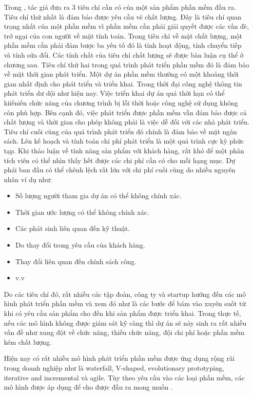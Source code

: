 \documentclass{article}
\begin{document}
Trong \cite{wisdomjobs}, tác giả đưa ra 3 tiêu chí cần có của một sản phẩm phần mềm đầu ra. Tiêu chí thứ nhất là đảm bảo được yêu cầu vè chất lượng. Đây là tiêu chí quan trọng nhất của một phần mềm vì phần mềm cần phải giải quyết được các vấn đè, trở ngại của con người về mặt tính toán. Trong tiêu chí về mặt chất lượng, một phần mềm cần phải đảm bược ba yếu tố đó là tính hoạt động, tính chuyển tiếp và tính sửa đổi. Các tính chất của tiêu chí chất lượng sẽ được bàn luận cụ thể ở chương sau. Tiêu chí thứ hai trong quá trình phát triển phần mềm đó là đảm bảo về mặt thời gian phát triển. Một dự án phần mềm thường có một khoảng thời gian nhất định cho phát triển và triển khai. Trong thời đại công nghệ thông tin phát triển dư dội như hiện nay. Việc triển khai dự án quá thời hạn có thể kiiếniến chức năng của chương trình bị lỗi thời hoặc công nghệ sử dụng không còn phù hợp. Bên cạnh đó, việc phát triển được phần mềm vẫn đảm bảo được cả chất lượng và thời gian cho phép không phải là việc dễ đối với các nhà phát triển. Tiêu chí cuối cùng của quá trình phát triển đó chính là đảm bảo về mặt ngân sách. Lên kế hoạch và tính toán chi phí phát triển là một quá trình cực kỳ phức tạp. Khi thảo luận về tính năng sản phẩm với khách hàng, rất khó để một phân tích viên có thể nhìn thấy hết được các chi phí cần có cho mỗi hạng mục. Dự phái ban đầu có thể chênh lệch rất lớn với chi phí cuối cùng do nhiều nguyên nhân ví dụ như:
\begin{itemize}
	\item Số lượng người tham gia dự án có thể không chính xác.
	\item Thời gian ước lượng có thể không chính xác.
	\item Các phát sinh liên quan đến kỹ thuật.
	\item Do thay đổi trong yêu cầu của khách hàng.
	\item Thay đổi liên quan đến chính sách công.
	\item v.v
	\end{itemize} 


Do các tiêu chí đó, rất nhiều các tập đoàn, công ty và startup hướng đến các mô hình phát triển phần mềm và xem đó như là các bước để bám vào xuyên suốt từ khi có yêu cầu sản phẩm cho đến khi sản phẩm được triển khai. Trong thực tế, nếu các mô hình không được giám sát kỹ càng thì dự án sẽ nảy sinh ra rất nhiều vấn đề như xung đột về chức năng, thiếu chức năng, đội chi phí hoặc phần mềm kém chất lượng. 


Hiện nay có rất nhiều mô hình phát triển phần mềm được ứng dụng rộng rãi trong doanh nghiệp như là waterfall, V-shaped, evolutionary prototyping, iterative and incremental và agile. Tùy theo yêu cầu vào các loại phần mềm, các mô hình được áp dụng để cho được đầu ra mong muốn \cite{roberthalf_2019}. 
\end{document}
